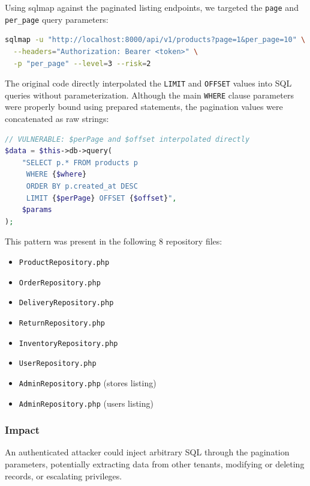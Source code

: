 \documentclass[12pt,a4paper]{article}
\begin{document}
Using sqlmap against the paginated listing endpoints, we targeted the \texttt{page} and \texttt{per\_page} query parameters:

\begin{lstlisting}[language=bash, caption={sqlmap command targeting pagination}]
sqlmap -u "http://localhost:8000/api/v1/products?page=1&per_page=10" \
  --headers="Authorization: Bearer <token>" \
  -p "per_page" --level=3 --risk=2
\end{lstlisting}

The original code directly interpolated the \texttt{LIMIT} and \texttt{OFFSET} values into SQL queries without parameterization. Although the main \texttt{WHERE} clause parameters were properly bound using prepared statements, the pagination values were concatenated as raw strings:

\begin{lstlisting}[language=PHP, caption={Vulnerable code -- string interpolation in LIMIT/OFFSET}]
// VULNERABLE: $perPage and $offset interpolated directly
$data = $this->db->query(
    "SELECT p.* FROM products p
     WHERE {$where}
     ORDER BY p.created_at DESC
     LIMIT {$perPage} OFFSET {$offset}",
    $params
);
\end{lstlisting}

This pattern was present in the following 8 repository files:

\begin{itemize}
  \item \texttt{ProductRepository.php}
  \item \texttt{OrderRepository.php}
  \item \texttt{DeliveryRepository.php}
  \item \texttt{ReturnRepository.php}
  \item \texttt{InventoryRepository.php}
  \item \texttt{UserRepository.php}
  \item \texttt{AdminRepository.php} (stores listing)
  \item \texttt{AdminRepository.php} (users listing)
\end{itemize}

\subsubsection{Impact}

An authenticated attacker could inject arbitrary SQL through the pagination parameters, potentially extracting data from other tenants, modifying or deleting records, or escalating privileges.
\end{document}
